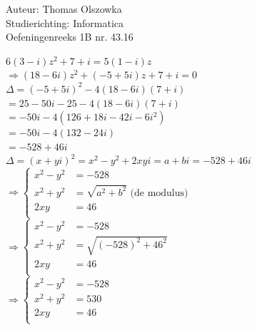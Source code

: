 \documentclass[a4paper]{article}
\begin{document}
\noindent \large Auteur: Thomas Olszowka \\
\noindent \large Studierichting: Informatica \\
\noindent \large Oefeningenreeks 1B nr. 43.16 \\



\medskip

\normalsize

$6(3-i)z^2 + 7 + i = 5(1-i)z$ \\

$\Rightarrow (18-6i)z^2 + (-5+5i)z + 7 + i = 0$ \\

$\Delta = (-5+5i)^2 -4(18-6i)(7+i)$ \\

$= 25 - 50i -25 -4(18-6i)(7+i)$ \\

$= -50i -4(126 + 18i -42i -6i^2)$ \\

$= -50i -4(132 - 24i)$ \\

$= -528 + 46i$ \\

$\Delta = (x+yi)^2 = x^2 - y^2 + 2xyi = a + bi = -528 + 46i $ \\

$\Rightarrow \left\{
\begin{array}{lll}
x^2 - y^2 &= -528    \\

x^2 + y^2 &= \sqrt{a^2 + b^2} \text{ (de modulus)}  \\

2xy &= 46   \\
\end{array}
\right .$\\

$\Rightarrow \left\{
\begin{array}{lll}
x^2 - y^2 &= -528    \\

x^2 + y^2 &= \sqrt{(-528)^2 + 46^2}  \\

2xy &= 46   \\
\end{array}
\right .$\\

$\Rightarrow \left\{
\begin{array}{lll}
x^2 - y^2 &= -528    \\

x^2 + y^2 &= 530   \\

2xy &= 46   \\
\end{array}
\right .$\\
\end{document}
